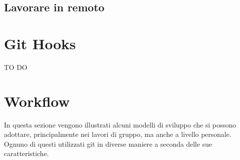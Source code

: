 	
	\subsection{Lavorare in remoto} %
	\label{sub:lavorare_in_remoto}
	

\newpage \clearpage
\section{Git Hooks} %
\label{sec:git_hooks}
TO DO






\newpage \clearpage
\section{Workflow} %
\label{sec:workflow}
In questa sezione vengono illustrati alcuni modelli di sviluppo che si possono adottare, principalmente nei lavori di gruppo, ma anche a livello personale. Ognuno di questi utilizzati git in diverse maniere a seconda delle sue caratteristiche.

